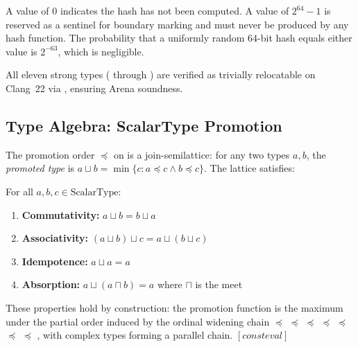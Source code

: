 \begin{invariant}
\label{inv:hashzero}
A value of $0$ indicates the hash has not been computed.
A value of $2^{64}-1$ is reserved as a sentinel for boundary marking
and must never be produced by any hash function.
The probability that a uniformly random 64-bit hash equals either
value is $2^{-63}$, which is negligible.
\end{invariant}

All eleven strong types ( through )
are verified as trivially relocatable on Clang~22 via
, ensuring Arena
 soundness.

\subsection{Type Algebra: ScalarType Promotion}
\label{sec:type-promotion}

\begin{definition}
\label{def:promotion}
The promotion order $\preceq$ on  is a join-semilattice:
for any two types $a, b$, the \emph{promoted type} is $a \sqcup b = \min\{c : a \preceq c \land b \preceq c\}$.
The lattice satisfies:
\end{definition}

\begin{property}
\label{prop:promotion}
For all $a, b, c \in \text{ScalarType}$:
\begin{enumerate}
  \item \textbf{Commutativity:} $a \sqcup b = b \sqcup a$
  \item \textbf{Associativity:} $(a \sqcup b) \sqcup c = a \sqcup (b \sqcup c)$
  \item \textbf{Idempotence:} $a \sqcup a = a$
  \item \textbf{Absorption:} $a \sqcup (a \sqcap b) = a$ where $\sqcap$ is the meet
\end{enumerate}
These properties hold by construction: the promotion function is the
maximum under the partial order induced by the ordinal widening chain
 $\preceq$  $\preceq$  $\preceq$ 
$\preceq$  $\preceq$  $\preceq$ 
$\preceq$ , with complex types forming a parallel chain.
$[\textit{consteval}]$
\end{property}
